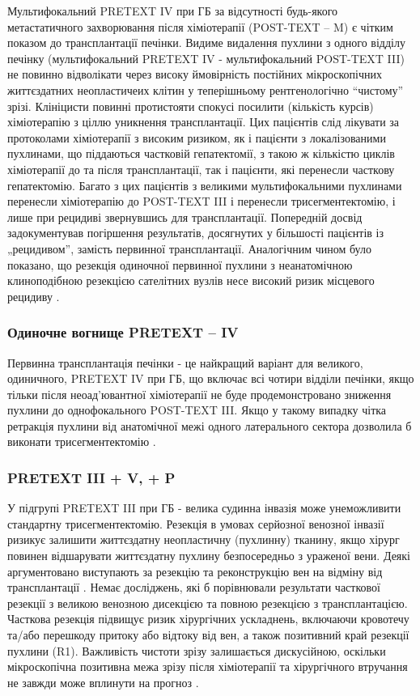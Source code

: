 Мультифокальний PRETEXT IV при ГБ за відсутності будь-якого метастатичного захворювання після хіміотерапії (POST-TEXT – M) є чітким показом до трансплантації печінки. Видиме видалення пухлини з одного відділу печінку (мультифокальний PRETEXT IV - мультифокальний POST-TEXT III) не повинно відволікати через високу ймовірність постійних мікроскопічних життєздатних неопластичеих клітин у теперішньому рентгенологічно “чистому” зрізі. Клініцисти повинні протистояти спокусі посилити (кількість курсів) хіміотерапію з ціллю уникнення трансплантації. Цих пацієнтів слід лікувати за протоколами хіміотерапії з високим ризиком, як і пацієнти з локалізованими пухлинами, що піддаються частковій гепатектомії, з такою ж кількістю циклів хіміотерапії до та після трансплантації, так і пацієнти, які перенесли часткову гепатектомію. Багато з цих пацієнтів з великими мультифокальними пухлинами перенесли хіміотерапію до POST-TEXT III і перенесли трисегментектомію, і лише при рецидиві звернувшись для  трансплантації. Попередній досвід задокументував погіршення результатів, досягнутих у більшості пацієнтів із „рецидивом”, замість первинної трансплантації. Аналогічним чином було показано, що резекція одиночної первинної пухлини з неанатомічною клиноподібною резекцією сателітних вузлів несе високий ризик місцевого рецидиву \cite{pmid19040959}.

\subsubsection{Одиночне вогнище PRETEXT – IV} 

Первинна трансплантація печінки - це найкращий варіант для великого, одиничного, PRETEXT IV при ГБ, що включає всі чотири відділи печінки, якщо тільки після неоад’ювантної хіміотерапії не буде продемонстровано зниження пухлини до однофокального POST-TEXT III. Якщо у такому випадку чітка ретракція пухлини від анатомічної межі одного латерального сектора дозволила б виконати трисегментектомію \cite{pmid31683629}.

\subsubsection{PRETEXT III + V, + P} 

У підгрупі PRETEXT III при ГБ -  велика судинна інвазія може унеможливити стандартну трисегментектомію. Резекція в умовах серйозної венозної інвазії ризикує залишити життєздатну неопластичну (пухлинну) тканину, якщо хірург повинен відшарувати життєздатну пухлину безпосередньо з ураженої вени. Деякі аргументовано виступають за резекцію та реконструкцію вен на відміну від трансплантації \cite{pmid20938901}. Немає досліджень, які б порівнювали результати часткової резекції з великою венозною дисекцією та повною резекцією з трансплантацією. Часткова резекція підвищує ризик хірургічних ускладнень, включаючи кровотечу та/або перешкоду притоку або відтоку від вен, а також позитивний край резекції пухлини (R1). Важливість чистоти зрізу залишається дискусійною, оскільки мікроскопічна позитивна межа зрізу після хіміотерапії та хірургічного втручання не завжди може вплинути на прогноз \cite{pmid24757164}.

